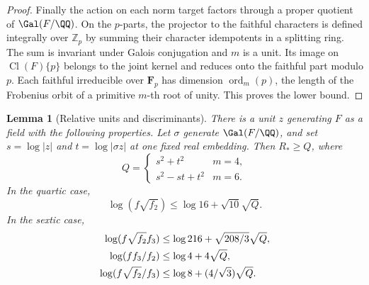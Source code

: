 \documentclass[a4paper,11pt]{article}
\newtheorem{lemma}[proposition]{Lemma}
\theoremstyle{definition}
\theoremstyle{remark}
\newcommand{\ZZ}{\mathbb Z}\newcommand{\ord}{\operatorname{ord}}
\numberwithin{equation}{section}
\newcommand{\Cl}{\operatorname{Cl}}
\begin{document}
\begin{proof}
Finally the action on each norm target factors through a proper
quotient of \(\Gal(F/\QQ)\). On the \(p\)-parts, the projector to
the faithful characters is defined integrally over \(\ZZ_p\) by
summing their character idempotents in a splitting ring. The sum
is invariant under Galois conjugation and \(m\) is a unit.
Its image on \(\Cl(F)\{p\}\) belongs to the joint kernel and
reduces onto the faithful part modulo \(p\). Each faithful
irreducible over \(\mathbf F_p\) has dimension
\(\operatorname{ord}_m(p)\), the length of the Frobenius orbit of a
primitive \(m\)-th root of unity. This proves the lower bound.
\end{proof}

\begin{lemma}[Relative units and discriminants]\label{lem:unit195}
There is a unit \(z\) generating \(F\) as a field with the following
properties. Let \(\sigma\) generate \(\Gal(F/\QQ)\), and set
\(s=\log|z|\) and \(t=\log|\sigma z|\) at one fixed real embedding.
Then \(R_*\ge Q\), where
\[
 Q=\begin{cases}s^2+t^2&m=4,\\s^2-st+t^2&m=6.\end{cases}
\]
In the quartic case,
\begin{equation}
       \log(f\sqrt{f_2})\le\log16+\sqrt{10}\sqrt Q .
       \label{eq:quart195}
\end{equation}
In the sextic case,
\begin{align}
 \log(f\sqrt{f_2} f_3)&\le\log216+\sqrt{208/3}\sqrt Q,\notag\\
 \log(f f_3/f_2)&\le\log4+4\sqrt Q,\notag\\
 \log(f\sqrt{f_2}/f_3)&\le\log8+(4/\sqrt3)\sqrt Q .
       \label{eq:sext195}
\end{align}
\end{lemma}
\end{document}
